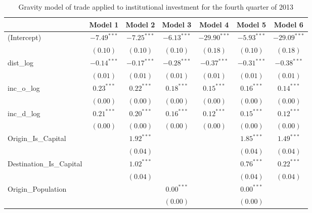 \begin{table}
	\small
	\begin{center}
		\caption[CGravity Model of Trade for Q4 2013]{Gravity model of trade applied to institutional investment for the fourth quarter of 2013}
		\begin{tabular}{l c c c c c c }
\hline
& Model 1 & Model 2 & Model 3 & Model 4 & Model 5 & Model 6 \\
\hline
(Intercept)                  & $-7.49^{***}$ & $-7.25^{***}$ & $-6.13^{***}$ & $-29.90^{***}$ & $-5.93^{***}$ & $-29.09^{***}$ \\
& $(0.10)$      & $(0.10)$      & $(0.10)$      & $(0.18)$       & $(0.10)$      & $(0.18)$       \\
dist\_log                    & $-0.14^{***}$ & $-0.17^{***}$ & $-0.28^{***}$ & $-0.37^{***}$  & $-0.31^{***}$ & $-0.38^{***}$  \\
& $(0.01)$      & $(0.01)$      & $(0.01)$      & $(0.01)$       & $(0.01)$      & $(0.01)$       \\
inc\_o\_log                  & $0.23^{***}$  & $0.22^{***}$  & $0.18^{***}$  & $0.15^{***}$   & $0.16^{***}$  & $0.14^{***}$   \\
& $(0.00)$      & $(0.00)$      & $(0.00)$      & $(0.00)$       & $(0.00)$      & $(0.00)$       \\
inc\_d\_log                  & $0.21^{***}$  & $0.20^{***}$  & $0.16^{***}$  & $0.12^{***}$   & $0.15^{***}$  & $0.12^{***}$   \\
& $(0.00)$      & $(0.00)$      & $(0.00)$      & $(0.00)$       & $(0.00)$      & $(0.00)$       \\
Origin\_Is\_Capital          &               & $1.92^{***}$  &               &                & $1.85^{***}$  & $1.49^{***}$   \\
&               & $(0.04)$      &               &                & $(0.04)$      & $(0.04)$       \\
Destination\_Is\_Capital     &               & $1.02^{***}$  &               &                & $0.76^{***}$  & $0.22^{***}$   \\
&               & $(0.04)$      &               &                & $(0.04)$      & $(0.04)$       \\
Origin\_Population           &               &               & $0.00^{***}$  &                & $0.00^{***}$  &                \\
&               &               & $(0.00)$      &                & $(0.00)$      &                \\

\end{tabular}
\end{center}
\end{table}

